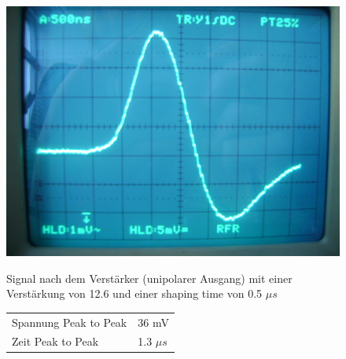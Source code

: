 \begin{figure}[H]
\begin{minipage}{0.4\textwidth}
\centering \includegraphics[width = \textwidth]{messergebnisse/2.JPG}
\end{minipage}
\begin{minipage}{0.59\textwidth}
Signal nach dem Verstärker (unipolarer Ausgang) mit einer Verstärkung von 12.6 und einer shaping time von 0.5 $\mu s$

\centering \begin{tabular}{l l}
Spannung Peak to Peak & 36 mV\\
Zeit Peak to Peak & 1.3 $\mu s$
\end{tabular}
\end{minipage}
\end{figure}

\clearpage %

